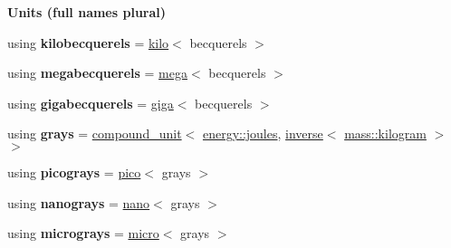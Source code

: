 \begin{Indent}{\bf Units (full names plural)}
\begin{DoxyCompactItemize}
\item 
\hypertarget{namespaceunits_1_1radiation_a1ae3a54e5e3d6c912f98e9195527ca9d}{}using {\bfseries kilobecquerels} = \hyperlink{group___unit_manipulators_ga89965a45aaa6689548b9c53858759c5e}{kilo}$<$ becquerels $>$\label{namespaceunits_1_1radiation_a1ae3a54e5e3d6c912f98e9195527ca9d}

\item 
\hypertarget{namespaceunits_1_1radiation_a259f0ee9d24846a358b8fef3d551329a}{}using {\bfseries megabecquerels} = \hyperlink{group___unit_manipulators_gab1e685fcf4dd9478ed3d688f7af50842}{mega}$<$ becquerels $>$\label{namespaceunits_1_1radiation_a259f0ee9d24846a358b8fef3d551329a}

\item 
\hypertarget{namespaceunits_1_1radiation_a70e90ed9aec08037c7fd6942f0675dfe}{}using {\bfseries gigabecquerels} = \hyperlink{group___unit_manipulators_ga4595911f659ef61133216da15d61eb07}{giga}$<$ becquerels $>$\label{namespaceunits_1_1radiation_a70e90ed9aec08037c7fd6942f0675dfe}

\item 
\hypertarget{namespaceunits_1_1radiation_a30bc48d83f2bff0eebd9f0a9fca800c3}{}using {\bfseries grays} = \hyperlink{group___unit_types_ga9c3f6f077dc894620e1ed8358442a8f1}{compound\+\_\+unit}$<$ \hyperlink{structunits_1_1unit}{energy\+::joules}, \hyperlink{group___unit_manipulators_gaacc539ef162e24b260d023d3ff949b57}{inverse}$<$ \hyperlink{structunits_1_1unit}{mass\+::kilogram} $>$$>$\label{namespaceunits_1_1radiation_a30bc48d83f2bff0eebd9f0a9fca800c3}

\item 
\hypertarget{namespaceunits_1_1radiation_a0ede3732905c6a6dd55d0a621b78e31c}{}using {\bfseries picograys} = \hyperlink{group___unit_manipulators_ga82a8d14a3e0877a375a66b64c45baab9}{pico}$<$ grays $>$\label{namespaceunits_1_1radiation_a0ede3732905c6a6dd55d0a621b78e31c}

\item 
\hypertarget{namespaceunits_1_1radiation_a88d947d50396a4c622759f59897c47c6}{}using {\bfseries nanograys} = \hyperlink{group___unit_manipulators_ga1c25c3c1d6c1f3aed3fd1ecf043110d5}{nano}$<$ grays $>$\label{namespaceunits_1_1radiation_a88d947d50396a4c622759f59897c47c6}

\item 
\hypertarget{namespaceunits_1_1radiation_aa1f108f95b8b4f6980608def82bb647c}{}using {\bfseries micrograys} = \hyperlink{group___unit_manipulators_gaea53c906ec805110b93f02db4a961971}{micro}$<$ grays $>$\label{namespaceunits_1_1radiation_aa1f108f95b8b4f6980608def82bb647c}


\end{DoxyCompactItemize}
\end{Indent}
